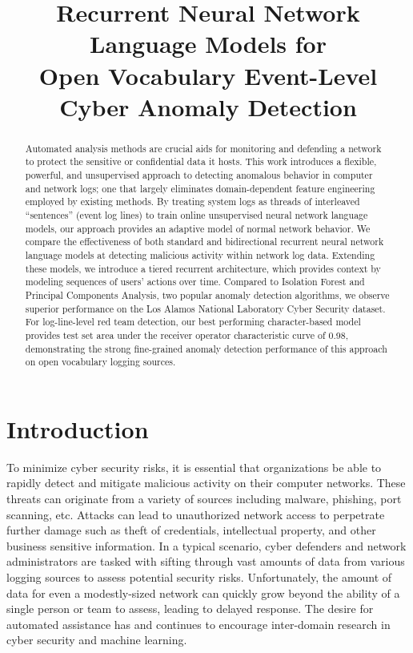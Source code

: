 \documentclass[letterpaper]{article} %
\title{Recurrent Neural Network Language Models for\\Open Vocabulary Event-Level Cyber Anomaly Detection}
\author{Aaron Tuor,\textsuperscript{1}
Ryan Baerwolf,\textsuperscript{2}
Nicolas Knowles,\textsuperscript{2}\\
{\bf \Large Brian Hutchinson,\textsuperscript{1,2}
Nicole Nichols\textsuperscript{1} \and
Robert Jasper\textsuperscript{1}}\\
\textsuperscript{1}Pacific Northwest National Laboratory\\Richland, Washington\\
\textsuperscript{2}Western Washington University\\Bellingham, Washington}
\begin{document}
\maketitle

\begin{abstract}
 	Automated analysis methods are crucial aids for monitoring and defending a network to protect the sensitive or confidential data it hosts.
    This work introduces a flexible, powerful, and unsupervised approach to detecting anomalous behavior in computer and network logs;
    one that largely eliminates domain-dependent feature engineering employed by existing methods.
    By treating system logs as threads of interleaved ``sentences'' (event log lines) to train online unsupervised neural network language models, our approach provides an adaptive model of normal network behavior.
    We compare the effectiveness of both standard and bidirectional recurrent neural network language models at detecting malicious activity within network log data.
    Extending these models, we introduce a tiered recurrent architecture, which provides context by modeling sequences of users' actions over time.
    Compared to Isolation Forest and Principal Components Analysis, two popular anomaly detection algorithms, we observe superior performance on the Los Alamos National Laboratory Cyber Security dataset.
    For log-line-level red team detection, our best performing character-based model provides test set area under the receiver operator characteristic curve of 0.98, demonstrating the strong fine-grained anomaly detection performance of this approach on open vocabulary logging sources.
\end{abstract}

\section{Introduction}

To minimize cyber security risks, it is essential that organizations be able to rapidly detect and mitigate malicious activity on their computer networks.
These threats can originate from a variety of sources including malware, phishing, port scanning, etc.
Attacks can lead to unauthorized network access to perpetrate further damage such as theft of credentials, intellectual property, and other business sensitive information.
In a typical scenario, cyber defenders and network administrators are tasked with sifting through vast amounts of data from various logging sources to assess potential security risks.
Unfortunately, the amount of data for even a modestly-sized network can quickly grow beyond the ability of a single person or team to assess, leading to delayed response.
The desire for automated assistance has and continues to encourage inter-domain research in cyber security and machine learning.
\end{document}
